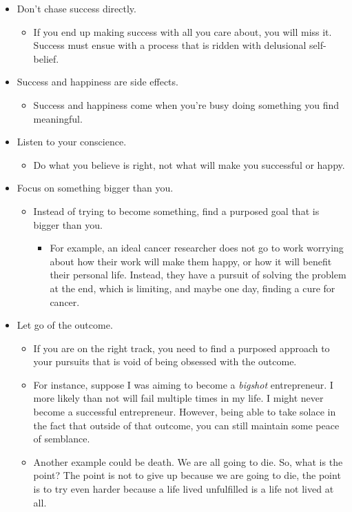 \begin{itemize}
    \item Don't chase success directly.
    \begin{itemize}
        \item If you end up making success with all you care about, you will miss it. Success must ensue with a process that is ridden with delusional self-belief.
    \end{itemize}

    \item Success and happiness are side effects.
    \begin{itemize}
        \item Success and happiness come when you're busy doing something you find meaningful.
    \end{itemize}

    \item Listen to your conscience.
    \begin{itemize}
        \item Do what you believe is right, not what will make you successful or happy.
    \end{itemize}

    \item Focus on something bigger than you.
    \begin{itemize}
        \item Instead of trying to become something, find a purposed goal that is bigger than you.
        \begin{itemize}
            \item For example, an ideal cancer researcher does not go to work worrying about how their work will make them happy, or how it will benefit their personal life. Instead, they have a pursuit of solving the problem at the end, which is limiting, and maybe one day, finding a cure for cancer.
        \end{itemize}
    \end{itemize}

    \item Let go of the outcome.
    \begin{itemize}
        \item If you are on the right track, you need to find a purposed approach to your pursuits that is void of being obsessed with the outcome.
        \item For instance, suppose I was aiming to become a \textit{bigshot} entrepreneur. I more likely than not will fail multiple times in my life. I might never become a successful entrepreneur. However, being able to take solace in the fact that outside of that outcome, you can still maintain some peace of semblance.
        \item Another example could be death. We are all going to die. So, what is the point? The point is not to give up because we are going to die, the point is to try even harder because a life lived unfulfilled is a life not lived at all.
    \end{itemize}
\end{itemize}